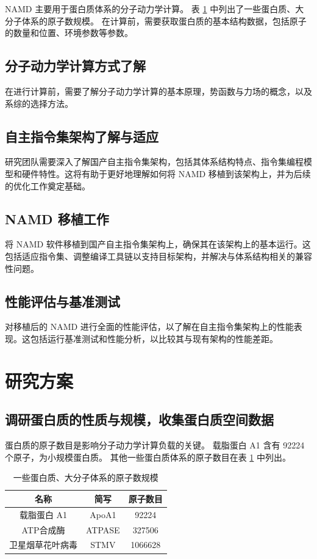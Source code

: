 NAMD 主要用于蛋白质体系的分子动力学计算。
表 \ref{tab:protein-size} 中列出了一些蛋白质、大分子体系的原子数规模。
在计算前，需要获取蛋白质的基本结构数据，包括原子的数量和位置、环境参数等参数。

\subsection{分子动力学计算方式了解}

在进行计算前，需要了解分子动力学计算的基本原理，势函数与力场的概念，以及系综的选择方法。

\subsection{自主指令集架构了解与适应}

研究团队需要深入了解国产自主指令集架构，包括其体系结构特点、指令集编程模型和硬件特性。这将有助于更好地理解如何将 NAMD 移植到该架构上，并为后续的优化工作奠定基础。

\subsection{NAMD 移植工作}

将 NAMD 软件移植到国产自主指令集架构上，确保其在该架构上的基本运行。这包括适应指令集、调整编译工具链以支持目标架构，并解决与体系结构相关的兼容性问题。

\subsection{性能评估与基准测试}

对移植后的 NAMD 进行全面的性能评估，以了解在自主指令集架构上的性能表现。这包括运行基准测试和性能分析，以比较其与现有架构的性能差距。

\section{研究方案}

\subsection{调研蛋白质的性质与规模，收集蛋白质空间数据}

蛋白质的原子数目是影响分子动力学计算负载的关键。
载脂蛋白 A1 含有 92224 个原子，为小规模蛋白质。
其他一些蛋白质体系的原子数目在表 \ref{tab:protein-size} 中列出。

\begin{table}[h]
    \centering
    \caption{一些蛋白质、大分子体系的原子数规模}
    \label{tab:protein-size}
    \begin{tabular}{ccc}
        \toprule
        名称       & 简写     & 原子数目    \\
        \midrule
        载脂蛋白 A1  & ApoA1  & 92224   \\
        ATP合成酶   & ATPASE & 327506  \\
        卫星烟草花叶病毒 & STMV   & 1066628 \\
        \bottomrule
    \end{tabular}
\end{table}

